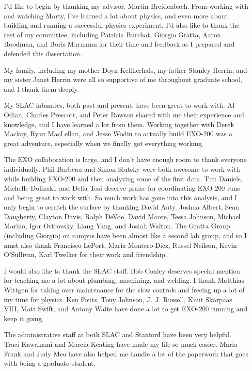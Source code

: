 I'd like to begin by thanking my advisor, Martin Breidenbach. From working with and watching Marty, I've learned a lot about physics, and even more about building and running a successful physics experiment. I'd also like to thank the rest of my committee, including Patricia Burchat, Giorgio Gratta, Aaron Roodman, and Boris Murmann for their time and feedback as I prepared and defended this dissertation.

My family, including my mother Doyn Kellherhals, my father Stanley Herrin, and my sister Janet Herrin were all so supportive of me throughout graduate school, and I thank them deeply. 

My SLAC labmates, both past and present, have been great to work with. Al Odian, Charles Prescott, and Peter Rowson shared with me their experience and knowledge, and I have learned a lot from them. Working together with Derek Mackay, Ryan MacLellan, and Jesse Wodin to actually build EXO-200 was a great adventure, especially when we finally got everything working.

The EXO collaboration is large, and I don't have enough room to thank everyone individually. Phil Barbeau and Simon Slutsky were both awesome to work with while building EXO-200 and then analyzing some of the first data. Tim Daniels, Michelle Dolinski, and Delia Tosi deserve praise for coordinating EXO-200 runs and being great to work with. So much work has gone into this analysis, and I only begin to scratch the surface by thanking David Auty, Joshua Albert, Sean Daugherty, Clayton Davis, Ralph DeVoe, David Moore, Tessa Johnson, Michael Marino, Igor Ostrovsky, Liang Yang, and Josiah Walton. The Gratta Group (including Giorgio) on campus have been almost like a second lab group, and so I must also thank Francisco LePort, Maria Montero-Diez, Russel Neilson, Kevin O'Sullivan, Karl Twelker for their work and friendship.

I would also like to thank the SLAC staff. Bob Conley deserves special mention for teaching me a lot about plumbing, machining, and welding. I thank Matthias Wittgen for taking over maintenance for the slow controls and freeing up a lot of my time for physics. Ken Fouts, Tony Johnson, J.~J. Russell, Knut Skarpaas VIII, Matt Swift, and Antony Waite have done a lot to get EXO-200 running and keep it going.

The administrative staff at both SLAC and Stanford have been very helpful. Traci Kawakami and Marcia Keating have made my life so much easier. Maria Frank and Judy Meo have also helped me handle a lot of the paperwork that goes with being a graduate student.

